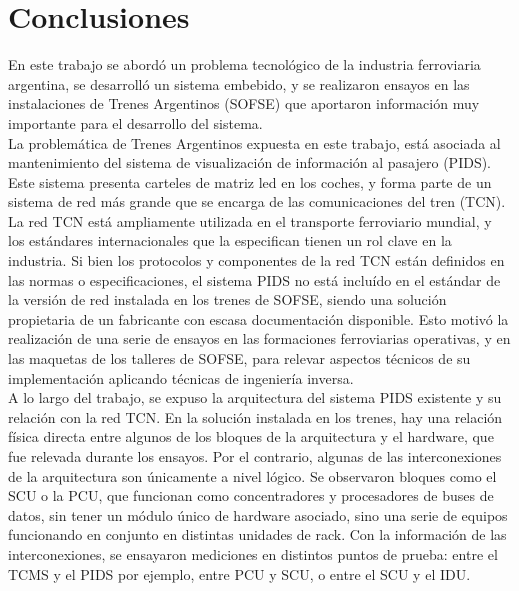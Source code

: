 
\chapter{Conclusiones} %

En este trabajo se abordó un problema tecnológico de la industria ferroviaria argentina, se desarrolló un sistema embebido, y se realizaron ensayos en las instalaciones de Trenes Argentinos (SOFSE) que aportaron información muy importante para el desarrollo del sistema.\\

La problemática de Trenes Argentinos expuesta en este trabajo, está asociada al mantenimiento del sistema de visualización de información al pasajero (PIDS). Este sistema presenta carteles de matriz led en los coches, y forma parte de un sistema de red más grande que se encarga de las comunicaciones del tren (TCN). La red TCN está ampliamente utilizada en el transporte ferroviario mundial, y los estándares internacionales que la especifican tienen un rol clave en la industria. Si bien los protocolos y componentes de la red TCN están definidos en las normas o especificaciones, el sistema PIDS no está incluído en el estándar de la versión de red instalada en los trenes de SOFSE, siendo una solución propietaria de un fabricante con escasa documentación disponible. Esto motivó la realización de una serie de ensayos en las formaciones ferroviarias operativas, y en las maquetas de los talleres de SOFSE, para relevar aspectos técnicos de su implementación aplicando técnicas de ingeniería inversa.\\

A lo largo del trabajo, se expuso la arquitectura del sistema PIDS existente y su relación con la red TCN. En la solución instalada en los trenes, hay una relación física directa entre algunos de los bloques de la arquitectura y el hardware, que fue relevada durante los ensayos. Por el contrario, algunas de las interconexiones de la arquitectura son únicamente a nivel lógico. Se observaron bloques como el SCU o la PCU, que funcionan como concentradores y procesadores de buses de datos, sin tener un módulo único de hardware asociado, sino una serie de equipos funcionando en conjunto en distintas unidades de rack.  Con la información de las interconexiones, se ensayaron mediciones en distintos puntos de prueba: entre el TCMS y el PIDS por ejemplo, entre PCU y SCU, o entre el SCU y el IDU. \\


